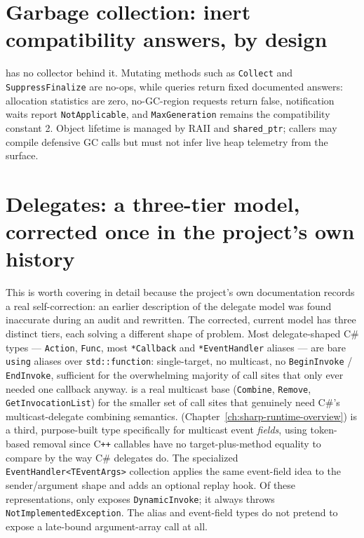 \section{Garbage collection: inert compatibility answers, by design}

 has no collector behind it. Mutating methods such as \texttt{Collect} and
\texttt{SuppressFinalize} are no-ops, while queries return fixed documented answers: allocation
statistics are zero, no-GC-region requests return false, notification waits report
\texttt{NotApplicable}, and \texttt{MaxGeneration} remains the compatibility constant 2. Object
lifetime is managed by RAII and \texttt{shared\_ptr}; callers may compile defensive GC calls but
must not infer live heap telemetry from the surface.

\section{Delegates: a three-tier model, corrected once in the project's own history}

This is worth covering in detail because the project's own documentation records a real
self-correction: an earlier description of the delegate model was found inaccurate during an
audit and rewritten. The corrected, current model has three distinct tiers, each solving a
different shape of problem. Most delegate-shaped C\# types --- \texttt{Action},
\texttt{Func}, most \texttt{*Callback} and \texttt{*EventHandler} aliases --- are bare
\texttt{using} aliases over
\texttt{std::function}: single-target, no multicast, no \texttt{BeginInvoke} /
\texttt{EndInvoke}, sufficient for the overwhelming majority of call sites that only ever
needed one callback anyway.  is a real multicast base
(\texttt{Combine}, \texttt{Remove}, \texttt{GetInvocationList}) for the smaller set of call
sites that genuinely need C\#'s multicast-delegate combining semantics.
 (Chapter~\ref{ch:sharp-runtime-overview}) is a
third, purpose-built type specifically for multicast event \emph{fields}, using
token-based removal since C\texttt{++} callables have no target-plus-method equality to
compare by the way C\# delegates do. The specialized
\texttt{EventHandler<TEventArgs>} collection applies the same event-field idea to the
sender/argument shape and adds an optional replay hook. Of these representations, only
 exposes \texttt{DynamicInvoke}; it always throws
\texttt{NotImplementedException}. The alias and event-field types do not pretend to expose a
late-bound argument-array call at all.

